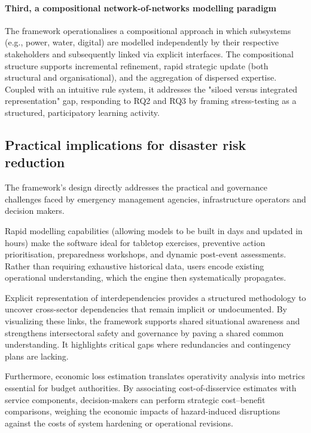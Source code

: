 \documentclass[review,12pt]{elsarticle}
\begin{document}
\paragraph{Third, a compositional network-of-networks modelling paradigm}
The framework operationalises a compositional approach in which subsystems (e.g., power, water, digital) are modelled independently by their respective stakeholders and subsequently linked via explicit interfaces. The compositional structure supports incremental refinement, rapid strategic update (both structural and organisational), and the aggregation of dispersed expertise. Coupled with an intuitive rule system, it addresses the "siloed versus integrated representation" gap, responding to RQ2 and RQ3 by framing stress-testing as a structured, participatory learning activity.


\subsection{Practical implications for disaster risk reduction}
\label{subsec:practical_implications}
The framework's design directly addresses the practical and governance challenges faced by emergency management agencies, infrastructure operators and decision makers.

Rapid modelling capabilities (allowing models to be built in days and updated in hours) make the software ideal for tabletop exercises, preventive action prioritisation, preparedness workshops, and dynamic post-event assessments. Rather than requiring exhaustive historical data, users encode existing operational understanding, which the engine then systematically propagates. 

Explicit representation of interdependencies provides a structured methodology to uncover cross-sector dependencies that remain implicit or undocumented. By visualizing these links, the framework supports shared situational awareness and strengthens intersectoral safety and governance by paving a shared common understanding. It highlights critical gaps where redundancies and contingency plans are lacking.

Furthermore, economic loss estimation translates operativity analysis into metrics essential for budget authorities. By associating cost-of-disservice estimates with service components, decision-makers can perform strategic cost--benefit comparisons, weighing the economic impacts of hazard-induced disruptions against the costs of system hardening or operational revisions. 
\end{document}
